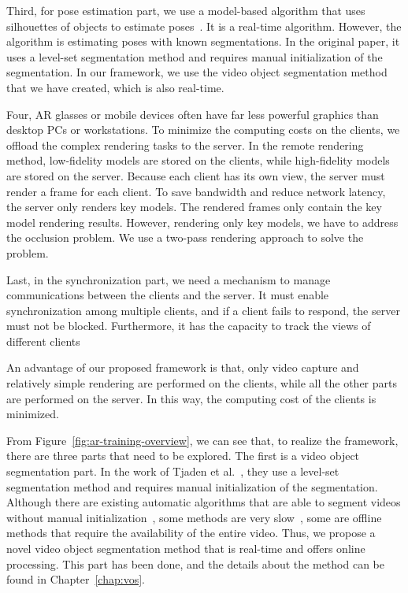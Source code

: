 Third, for pose estimation part, we use a model-based algorithm that uses silhouettes of objects to estimate poses~\cite{tjaden2016}.
It is a real-time algorithm.
However, the algorithm is estimating poses with known segmentations. In the original paper, it uses a level-set segmentation method and requires manual initialization of the segmentation.
In our framework, we use the video object segmentation method that we have created, which is also real-time.

Four, AR glasses or mobile devices often have far less powerful graphics than desktop PCs or workstations.
To minimize the computing costs on the clients, we offload the complex rendering tasks to the server.
In the remote rendering method, low-fidelity models are stored on the clients, while high-fidelity models are stored on the server.
Because each client has its own view, the server must render a frame for each client.
To save bandwidth and reduce network latency, the server only renders key models. The rendered frames only contain the key model rendering results.
However, rendering only key models, we have to address the occlusion problem. We use a two-pass rendering approach to solve the problem.

Last, in the synchronization part, we need a mechanism to manage communications between the clients and the server.
It must enable synchronization among multiple clients, and if a client fails to respond, the server must not be blocked.
Furthermore, it has the capacity to track the views of different clients

An advantage of our proposed framework is that, only video capture and relatively simple rendering are performed on the clients, while all the other parts are performed on the server.
In this way, the computing cost of the clients is minimized.

From Figure~\ref{fig:ar-training-overview}, we can see that, to realize the framework, there are three parts that need to be explored.
The first is a video object segmentation part. In the work of Tjaden et al.~\cite{tjaden2016}, they use a level-set segmentation method and requires manual initialization of the segmentation.
Although there are existing automatic algorithms that are able to segment videos without manual initialization~\cite{brox2010,ochs2011,ochs2012,papazoglou2013,wang2015}, some methods are very slow~\cite{brox2010,ochs2011,ochs2012}, some are offline methods that require the availability of the entire video.
Thus, we propose a novel video object segmentation method that is real-time and offers online processing.
This part has been done, and the details about the method can be found in Chapter~\ref{chap:vos}.

